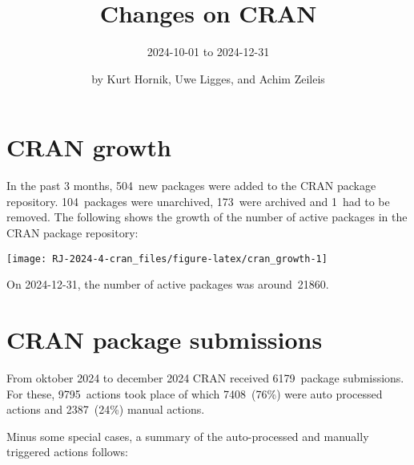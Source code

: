 \title{Changes on CRAN}

\subtitle{%
2024-10-01 to 2024-12-31
}

\author{by Kurt Hornik, Uwe Ligges, and Achim Zeileis}

\maketitle


\hypertarget{cran-growth}{%
\section{CRAN growth}\label{cran-growth}}

In the past 3 months, 504~new packages were
added to the CRAN package repository. 104~packages
were unarchived, 173~were archived and
1~had to be removed. The following shows the
growth of the number of active packages in the CRAN package repository:

\begin{center}\texttt{[image: RJ-2024-4-cran\_files/figure-latex/cran\_growth-1]} \end{center}

\noindent On 2024-12-31, the number of active packages was around~21860.

\hypertarget{cran-package-submissions}{%
\section{CRAN package submissions}\label{cran-package-submissions}}

From oktober 2024 to december 2024
CRAN received 6179~package submissions.
For these, 9795~actions took place of which
7408~(76\%) were auto processed actions and
2387~(24\%) manual actions.

Minus some special cases, a summary of the auto-processed and manually
triggered actions follows:

